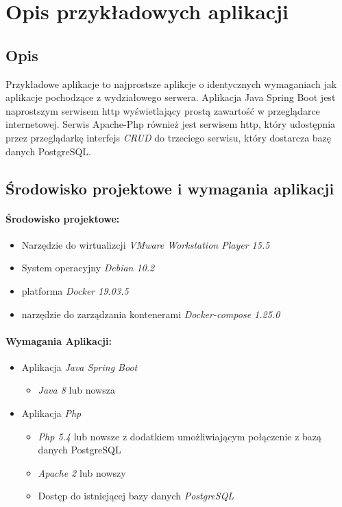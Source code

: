 \documentclass[polish, a4paper, 12pt, oneside]{book}
\begin{document}
\chapter{Opis przykładowych aplikacji}
\section{Opis}
Przykładowe aplikacje to najprostsze aplikcje o identycznych wymaganiach jak aplikacje pochodzące z wydziałowego serwera. Aplikacja Java Spring Boot jest naprostszym serwisem http wyświetlający prostą zawartość w przeglądarce internetowej. Serwis Apache-Php również jest serwisem http, który udostępnia przez przeglądarkę interfejs \textit{CRUD} do trzeciego serwisu, który dostarcza bazę danych PostgreSQL.  
\section{Środowisko projektowe i wymagania aplikacji}
\subsubsection{Środowisko projektowe:}
\begin{itemize}[noitemsep]
    \item Narzędzie do wirtualizcji \textit{VMware Workstation Player 15.5}\cite{vmwareplayer}
    \item System operacyjny \textit{Debian 10.2}\cite{debian10}
    \item platforma \textit{Docker 19.03.5}\cite{docker}
    \item narzędzie do zarządzania kontenerami \textit{Docker-compose 1.25.0}\cite{dockercompose}
\end{itemize}

\subsubsection{Wymagania Aplikacji:}
\begin{itemize}[noitemsep]
    \item Aplikacja \textit{Java Spring Boot}
    \begin{itemize}[noitemsep]
    	\item \textit{Java 8}\cite{java} lub nowsza
    \end{itemize}
    \item Aplikacja \textit{Php}
	\begin{itemize}[noitemsep]
		\item \textit{Php 5.4}\cite{php} lub nowsze z dodatkiem umożliwiającym połączenie z bazą danych PostgreSQL
		\item \textit{Apache 2}\cite{apache} lub nowszy
		\item Dostęp do istniejącej bazy danych \textit{PostgreSQL}\cite{postgresql}
	\end{itemize}
\end{itemize}
\end{document}
